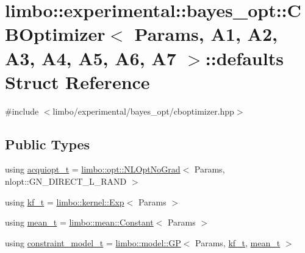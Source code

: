 \hypertarget{structlimbo_1_1experimental_1_1bayes__opt_1_1_c_b_optimizer_1_1defaults}{}\section{limbo\+:\+:experimental\+:\+:bayes\+\_\+opt\+:\+:C\+B\+Optimizer$<$ Params, A1, A2, A3, A4, A5, A6, A7 $>$\+:\+:defaults Struct Reference}
\label{structlimbo_1_1experimental_1_1bayes__opt_1_1_c_b_optimizer_1_1defaults}


{\ttfamily \#include $<$limbo/experimental/bayes\+\_\+opt/cboptimizer.\+hpp$>$}

\subsection*{Public Types}
\begin{DoxyCompactItemize}
\item 
using \hyperlink{structlimbo_1_1experimental_1_1bayes__opt_1_1_c_b_optimizer_1_1defaults_a4c7662e52d7a08fab22774eae4cb5822}{acquiopt\+\_\+t} = \hyperlink{structlimbo_1_1opt_1_1_n_l_opt_no_grad}{limbo\+::opt\+::\+N\+L\+Opt\+No\+Grad}$<$ Params, nlopt\+::\+G\+N\+\_\+\+D\+I\+R\+E\+C\+T\+\_\+\+L\+\_\+\+R\+A\+ND $>$
\item 
using \hyperlink{structlimbo_1_1experimental_1_1bayes__opt_1_1_c_b_optimizer_1_1defaults_aa9c7a3f40bfc804bb27aff96a162ccaf}{kf\+\_\+t} = \hyperlink{structlimbo_1_1kernel_1_1_exp}{limbo\+::kernel\+::\+Exp}$<$ Params $>$
\item 
using \hyperlink{structlimbo_1_1experimental_1_1bayes__opt_1_1_c_b_optimizer_1_1defaults_a102b232d75c97267704fa717bdeb8a9f}{mean\+\_\+t} = \hyperlink{structlimbo_1_1mean_1_1_constant}{limbo\+::mean\+::\+Constant}$<$ Params $>$
\item 
using \hyperlink{structlimbo_1_1experimental_1_1bayes__opt_1_1_c_b_optimizer_1_1defaults_a732a30715b9697aad5c6587cca6acfd3}{constraint\+\_\+model\+\_\+t} = \hyperlink{classlimbo_1_1model_1_1_g_p}{limbo\+::model\+::\+GP}$<$ Params, \hyperlink{structlimbo_1_1experimental_1_1bayes__opt_1_1_c_b_optimizer_1_1defaults_aa9c7a3f40bfc804bb27aff96a162ccaf}{kf\+\_\+t}, \hyperlink{structlimbo_1_1experimental_1_1bayes__opt_1_1_c_b_optimizer_1_1defaults_a102b232d75c97267704fa717bdeb8a9f}{mean\+\_\+t} $>$
\end{DoxyCompactItemize}


